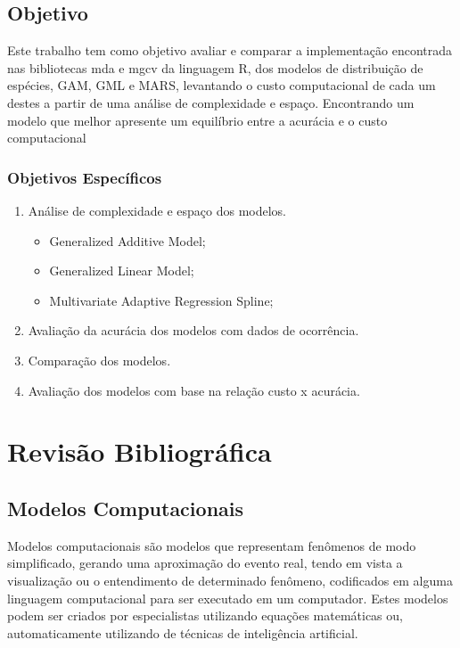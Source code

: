 \documentclass[
    12pt,               %
    openright,          %
    oneside,            %
    a4paper,            %
    english,            %
    brazil              %
    ]{abntex2}
\begin{document}
\section{Objetivo}

Este trabalho tem como objetivo avaliar e comparar a implementação encontrada
nas bibliotecas mda e mgcv da linguagem R, dos modelos de distribuição de espécies,
GAM, GML e MARS, levantando o custo computacional de cada um destes a partir de
uma análise de complexidade e espaço. Encontrando um modelo que melhor apresente
um equilíbrio entre a acurácia e o custo computacional

\subsection{Objetivos Específicos}

\begin{enumerate}
    \item Análise de complexidade e espaço dos modelos.
    \begin{itemize}
        \item Generalized Additive Model;
        \item Generalized Linear Model;
        \item Multivariate Adaptive Regression Spline;
    \end{itemize}
    \item Avaliação da acurácia dos modelos com dados de ocorrência.
    \item Comparação dos modelos.
    \item Avaliação dos modelos com base na relação custo x acurácia.
\end{enumerate}


\chapter{Revisão Bibliográfica}

\section{Modelos Computacionais}

Modelos computacionais são modelos que representam fenômenos de modo simplificado, gerando uma aproximação
do evento real, tendo em vista a visualização ou o entendimento de determinado fenômeno, codificados em 
alguma linguagem computacional para ser executado em um computador. Estes modelos podem ser criados
por especialistas utilizando equações matemáticas ou, automaticamente utilizando de técnicas de
inteligência artificial. \cite{modelos_computacionais}
\end{document}
